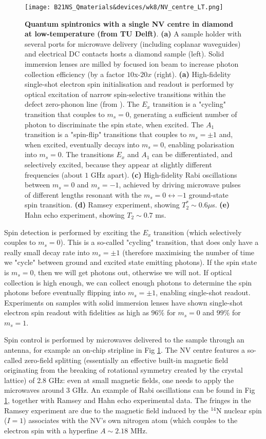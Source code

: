 \documentclass[a4paper,11pt]{article}
\begin{document}
\begin{figure}[h]
\centering
\texttt{[image: B21NS\_Qmaterials\&devices/wk8/NV\_centre\_LT.png]}
\caption{{\bf Quantum spintronics with a single NV centre in diamond at low-temperature (from TU Delft)}. {\bf (a)} A sample holder with several ports for microwave delivery (including coplanar waveguides) and electrical DC contacts hosts a diamond sample (left). Solid immersion lenses are milled by focused ion beam to increase photon collection efficiency (by a factor $10$x-$20x$ (right). {\bf (a)} High-fidelity single-shot electron spin initialisation and readout is performed by optical excitation of narrow spin-selective transitions within the defect zero-phonon line (from \cite{robledo_high-fidelity_2011}). The $E_x$ transition is a "cycling" transition that couples to $m_s=0$, generating a sufficient number of photon to discriminate the spin state, when excited. The $A_1$ transition is a "spin-flip" transitions that couples to $m_s = \pm 1$ and, when excited, eventually decays into $m_s = 0$, enabling polarisation into $m_s = 0$. The transitions $E_x$ and $A_1$ can be differentiated, and selectively excited, because they appear at slightly different frequencies (about $1$ GHz apart). {\bf (c)} High-fidelity Rabi oscillations between $m_s = 0$ and $m_s = -1$, achieved by driving microwave pulses of different lengths resonant with the $m_s = 0 \leftrightarrow -1$ ground-state spin transition. {\bf (d)} Ramsey experiment, showing $T_2^* \sim 0.6 \mu$s. {\bf (e)} Hahn echo experiment, showing $T_2 \sim 0.7$ ms.}
\label{fig:NV_LT}
\end{figure}

Spin detection is performed by exciting the $E_x$ transition (which selectively couples to $m_s = 0$). This is a so-called "cycling" transition, that does only have a really small decay rate into $m_s = \pm 1$ (therefore maximising the number of time we "cycle" between ground and excited state emitting photons). If the spin state is $m_s = 0$, then we will get photons out, otherwise we will not. If optical collection is high enough, we can collect enough photons to determine the spin photons before eventually flipping into $m_s = \pm 1$, enabling single-shot readout. Experiments on samples with solid immersion lenses have shown single-shot electron spin readout with fidelities as high as $96\%$ for $m_s = 0$ and $99\%$ for $m_s = 1$.

Spin control is performed by microwaves delivered to the sample through an antenna, for example an on-chip stripline in Fig \ref{fig:NV_LT}. The NV centre features a so-called zero-field splitting (essentially an effective built-in magnetic field originating from the breaking of rotational symmetry created by the crystal lattice) of 2.8 GHz: even at small magnetic fields, one needs to apply the microwaves around 3 GHz. An example of Rabi oscillations can be found in Fig \ref{fig:NV_LT}, together with Ramsey and Hahn echo experimental data. The fringes in the Ramsey experiment are due to the magnetic field induced by the $^{14}$N nuclear spin ($I=1$) associates with the NV's own nitrogen atom (which couples to the electron spin with a hyperfine $A \sim 2.18$ MHz.
\end{document}
